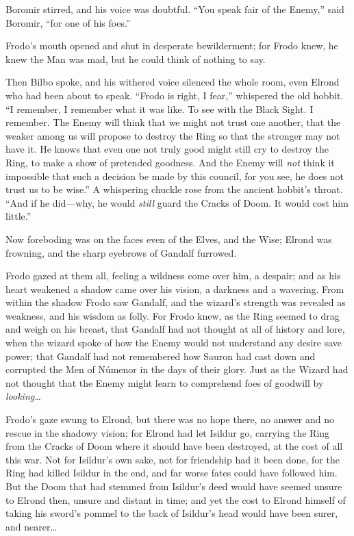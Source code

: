 Boromir stirred, and his voice was doubtful. “You speak fair of the Enemy,” said Boromir, “for one of his foes.”

Frodo’s mouth opened and shut in desperate bewilderment; for Frodo knew, he knew the Man was mad, but he could think of nothing to say.

Then Bilbo spoke, and his withered voice silenced the whole room, even Elrond who had been about to speak. “Frodo is right, I fear,” whispered the old hobbit. “I remember, I remember what it was like. To see with the Black Sight. I remember. The Enemy will think that we might not trust one another, that the weaker among us will propose to destroy the Ring so that the stronger may not have it. He knows that even one not truly good might still cry to destroy the Ring, to make a show of pretended goodness. And the Enemy will \emph{not} think it impossible that such a decision be made by this council, for you see, he does not trust us to be wise.” A whispering chuckle rose from the ancient hobbit’s throat. “And if he did—why, he would \emph{still} guard the Cracks of Doom. It would cost him little.”

Now foreboding was on the faces even of the Elves, and the Wise; Elrond was frowning, and the sharp eyebrows of Gandalf furrowed.

Frodo gazed at them all, feeling a wildness come over him, a despair; and as his heart weakened a shadow came over his vision, a darkness and a wavering. From within the shadow Frodo saw Gandalf, and the wizard’s strength was revealed as weakness, and his wisdom as folly. For Frodo knew, as the Ring seemed to drag and weigh on his breast, that Gandalf had not thought at all of history and lore, when the wizard spoke of how the Enemy would not understand any desire save power; that Gandalf had not remembered how Sauron had cast down and corrupted the Men of Númenor in the days of their glory. Just as the Wizard had not thought that the Enemy might learn to comprehend foes of goodwill by \emph{looking…}

Frodo’s gaze swung to Elrond, but there was no hope there, no answer and no rescue in the shadowy vision; for Elrond had let Isildur go, carrying the Ring from the Cracks of Doom where it should have been destroyed, at the cost of all this war. Not for Isildur’s own sake, not for friendship had it been done, for the Ring had killed Isildur in the end, and far worse fates could have followed him. But the Doom that had stemmed from Isildur’s deed would have seemed unsure to Elrond then, unsure and distant in time; and yet the cost to Elrond himself of taking his sword’s pommel to the back of Isildur’s head would have been surer, and nearer…


